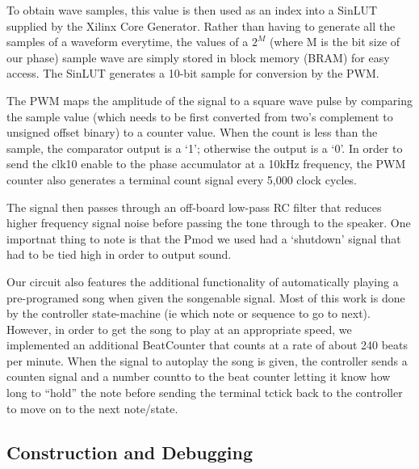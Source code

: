 \documentclass{article}
\begin{document}
    To obtain wave samples, this value is then used as an index into a SinLUT supplied by the Xilinx Core Generator. Rather than having to generate all the samples of a waveform everytime, the values of a $2^M$ (where M is the bit size of our phase) sample wave are simply stored in block memory (BRAM) for easy access. The SinLUT generates a 10-bit sample for conversion by the PWM.

    The PWM maps the amplitude of the signal to a square wave pulse by comparing the sample value (which needs to be first converted from two's complement to unsigned offset binary) to a counter value. When the count is less than the sample, the comparator output is a `1'; otherwise the output is a `0'. In order to send the clk10 enable to the phase accumulator at a 10kHz frequency, the PWM counter also generates a terminal count signal every 5,000 clock cycles. 

    The signal then passes through an off-board low-pass RC filter that reduces higher frequency signal noise before passing the tone through to the speaker. One importnat thing to note is that the Pmod we used had a `shutdown' signal that had to be tied high in order to output sound.

    Our circuit also features the additional functionality of automatically playing a pre-programed song when given the song\textunderscore enable signal. Most of this work is done by the controller state-machine (ie which note or sequence to go to next). However, in order to get the song to play at an appropriate speed, we implemented an additional BeatCounter that counts at a rate of about 240 beats per minute. When the signal to autoplay the song is given, the controller sends a count\textunderscore en signal and a number count\textunderscore to to the beat counter letting it know how long to ``hold'' the note before sending the terminal tc\textunderscore tick back to the controller to move on to the next note/state.

  \subsection{Construction and Debugging}

\end{document}
